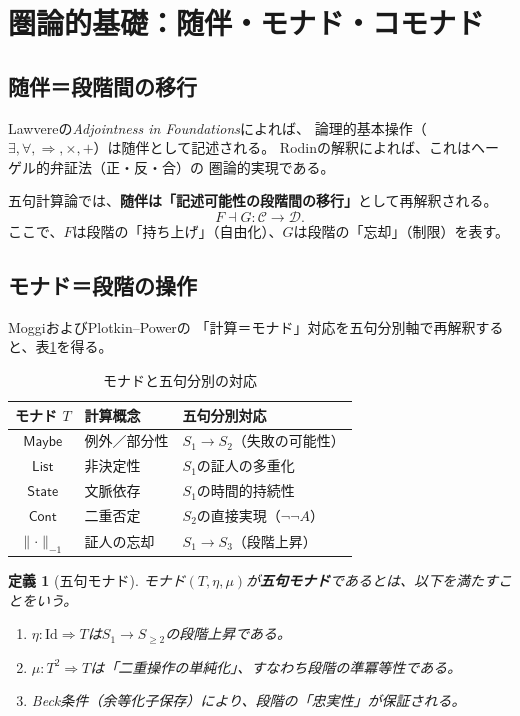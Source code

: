 \documentclass[11pt,a4paper]{ltjsarticle}
\newtheorem{definition}{定義}[section]
\theoremstyle{remark}
\newcommand{\Maybe}{\mathsf{Maybe}}
\newcommand{\List}{\mathsf{List}}
\newcommand{\State}{\mathsf{State}}
\newcommand{\Cont}{\mathsf{Cont}}
\newcommand{\Id}{\mathrm{Id}}
\begin{document}
\section{圏論的基礎：随伴・モナド・コモナド}

\subsection{随伴＝段階間の移行}

Lawvereの\textit{Adjointness in Foundations}\cite{Lawvere1967}によれば、
論理的基本操作（$\exists,\forall,\Rightarrow,\times,+$）は随伴として記述される。
Rodin\cite{Rodin2013}の解釈によれば、これはヘーゲル的弁証法（正・反・合）の
圏論的実現である。

五句計算論では、\textbf{随伴は「記述可能性の段階間の移行」}として再解釈される。
\[
  F\dashv G:\mathcal{C}\longrightarrow\mathcal{D}.
\]
ここで、$F$は段階の「持ち上げ」（自由化）、$G$は段階の「忘却」（制限）を表す。

\subsection{モナド＝段階の操作}

Moggi\cite{Moggi1991}およびPlotkin--Power\cite{PlotkinPower2002}の
「計算＝モナド」対応を五句分別軸で再解釈すると、表\ref{tab:monads}を得る。

\begin{table}[htbp]
\centering
\caption{モナドと五句分別の対応}
\label{tab:monads}
\small
\begin{tabularx}{\textwidth}{@{}c l >{\raggedright\arraybackslash}X@{}}
\toprule
モナド $T$ & 計算概念 & 五句分別対応 \\
\midrule
$\Maybe$ & 例外／部分性 & $S_1\to S_2$（失敗の可能性） \\
$\List$ & 非決定性 & $S_1$の証人の多重化 \\
$\State$ & 文脈依存 & $S_1$の時間的持続性 \\
$\Cont$ & 二重否定 & $S_2$の直接実現（$\neg\neg A$） \\
$\lVert\mathord{\cdot}\rVert_{-1}$ & 証人の忘却 & $S_1\to S_3$（段階上昇） \\
\bottomrule
\end{tabularx}
\end{table}

\begin{definition}[五句モナド]
モナド$(T,\eta,\mu)$が\textbf{五句モナド}であるとは、以下を満たすことをいう。
\begin{enumerate}
  \item $\eta:\Id\Rightarrow T$は$S_1\to S_{\geq 2}$の段階上昇である。
  \item $\mu:T^2\Rightarrow T$は「二重操作の単純化」、すなわち段階の準冪等性である。
  \item Beck条件（余等化子保存）により、段階の「忠実性」が保証される。
\end{enumerate}
\end{definition}
\end{document}
